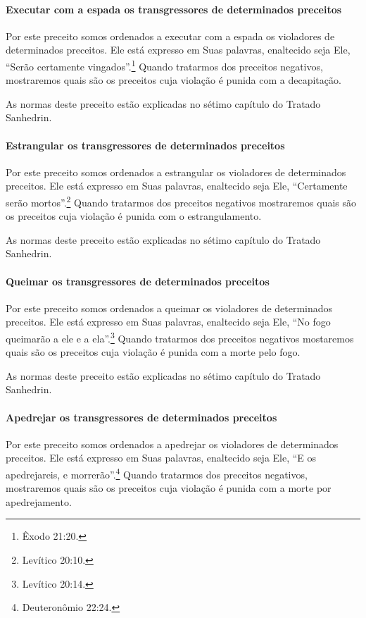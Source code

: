 \paragraph{Executar com a espada os transgressores de determinados preceitos}

Por este preceito somos ordenados a executar com a espada os violadores
de determinados preceitos. Ele está expresso em Suas palavras,
enaltecido seja Ele, ``Serão certamente vingados''.\footnote{Êxodo 21:20.}
Quando tratarmos dos preceitos negativos, mostraremos quais são os
preceitos cuja violação é punida com a decapitação.

As normas deste preceito estão explicadas no sétimo capítulo do Tratado
Sanhedrin.

\paragraph{Estrangular os transgressores de determinados preceitos}

Por este preceito somos ordenados a estrangular os violadores de
determinados preceitos. Ele está expresso em Suas palavras, enaltecido
seja Ele, ``Certamente serão mortos''.\footnote{Levítico 20:10.} Quando tratarmos
dos preceitos negativos mostraremos quais são os preceitos cuja violação
é punida com o estrangulamento.

As normas deste preceito estão explicadas no sétimo capítulo do Tratado
Sanhedrin.

\paragraph{Queimar os transgressores de determinados preceitos}

Por este preceito somos ordenados a queimar os violadores de
determinados preceitos. Ele está expresso em Suas palavras, enaltecido
seja Ele, ``No fogo queimarão a ele e a ela''.\footnote{Levítico 20:14.} Quando
tratarmos dos preceitos negativos mostaremos quais são os preceitos
cuja violação é punida com a morte pelo fogo.

As normas deste preceito estão explicadas no sétimo capítulo do Tratado
Sanhedrin.

\paragraph{Apedrejar os transgressores de determinados preceitos}

Por este preceito somos ordenados a apedrejar os violadores de
determinados preceitos. Ele está expresso em Suas palavras, enaltecido
seja Ele, ``E os apedrejareis, e morrerão''.\footnote{Deuteronômio 22:24.} Quando
tratarmos dos preceitos negativos, mostraremos quais são os preceitos
cuja violação é punida com a morte por apedrejamento.

